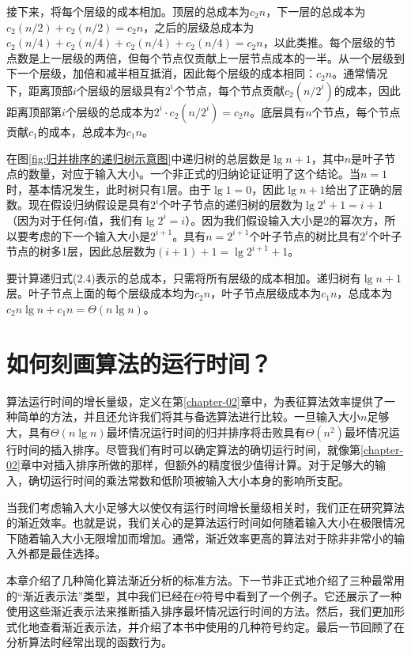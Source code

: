 \documentclass[lang=cn,newtx,10pt,scheme=chinese]{elegantbook}
\begin{document}
接下来，将每个层级的成本相加。顶层的总成本为$c_2n$，下一层的总成本为$c_2(n / 2)+c_2(n / 2)=c_2 n$，之后的层级总成本为$c_2(n / 4)+c_2(n / 4)+c_2(n / 4)+c_2(n / 4)=c_2 n$，以此类推。每个层级的节点数是上一层级的两倍，但每个节点仅贡献上一层节点成本的一半。从一个层级到下一个层级，加倍和减半相互抵消，因此每个层级的成本相同：$c_2n$。通常情况下，距离顶部$i$个层级的层级具有$2^i$个节点，每个节点贡献$c_2(n/2^i)$的成本，因此距离顶部第$i$个层级的总成本为$2^i \cdot c_2\left(n / 2^i\right)=c_2 n$。底层具有$n$个节点，每个节点贡献$c_1$的成本，总成本为$c_1n$。

在图\ref{fig:归并排序的递归树示意图}中递归树的总层数是$\lg n+1$，其中$n$是叶子节点的数量，对应于输入大小。一个非正式的归纳论证证明了这个结论。当$n=1$时，基本情况发生，此时树只有1层。由于$\lg 1 = 0$，因此$\lg n + 1$给出了正确的层数。现在假设归纳假设是具有$2^i$个叶子节点的递归树的层数为$\lg 2^i+1=i+1$（因为对于任何$i$值，我们有$\lg 2^i=i$）。因为我们假设输入大小是2的幂次方，所以要考虑的下一个输入大小是$2^{i+1}$。具有$n=2^{i+1}$个叶子节点的树比具有$2^i$个叶子节点的树多1层，因此总层数为$(i+1)+1=\lg{2^{i+1}}+1$。

要计算递归式(2.4)表示的总成本，只需将所有层级的成本相加。递归树有$\lg n + 1$层。叶子节点上面的每个层级成本均为$c_2n$，叶子节点层级成本为$c_1n$，总成本为$c_2 n \lg n + c_1 n = \Theta(n \lg n)$。

\chapter{如何刻画算法的运行时间？}\label{chapter-03}

算法运行时间的增长量级，定义在第\ref{chapter-02}章中，为表征算法效率提供了一种简单的方法，并且还允许我们将其与备选算法进行比较。一旦输入大小$n$足够大，具有$\Theta(n\lg n)$最坏情况运行时间的归并排序将击败具有$\Theta(n^2)$最坏情况运行时间的插入排序。尽管我们有时可以确定算法的确切运行时间，就像第\ref{chapter-02}章中对插入排序所做的那样，但额外的精度很少值得计算。对于足够大的输入，确切运行时间的乘法常数和低阶项被输入大小本身的影响所支配。

当我们考虑输入大小足够大以使仅有运行时间增长量级相关时，我们正在研究算法的渐近效率。也就是说，我们关心的是算法运行时间如何随着输入大小在极限情况下随着输入大小无限增加而增加。通常，渐近效率更高的算法对于除非非常小的输入外都是最佳选择。

本章介绍了几种简化算法渐近分析的标准方法。下一节非正式地介绍了三种最常用的``渐近表示法''类型，其中我们已经在$\Theta$符号中看到了一个例子。它还展示了一种使用这些渐近表示法来推断插入排序最坏情况运行时间的方法。然后，我们更加形式化地查看渐近表示法，并介绍了本书中使用的几种符号约定。最后一节回顾了在分析算法时经常出现的函数行为。
\end{document}
